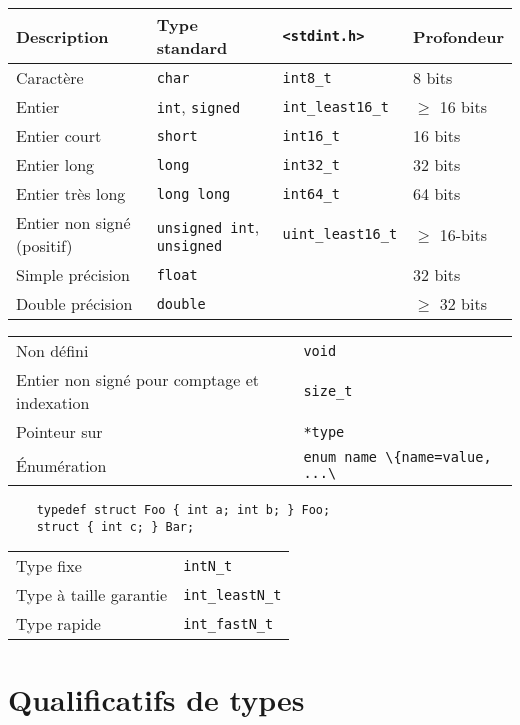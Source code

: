 \documentclass{article}
\newcommand{\cd}{\lstinline}
\begin{document}
\begin{multicols*}{3}
\begin{tabularx}{\linewidth}{Xlll}
  \bf Description & \bf Type standard & \bf \texttt{<stdint.h>} & \bf Profondeur \\
  \hline
  Caractère                   & \cd{char}      & \cd {int8_t} & 8 bits \\
  \hline
  Entier                      & \cd{int}, \cd{signed}  & \cd {int_least16_t} & $\geq$ 16 bits \\
  Entier court                & \cd{short}     & \cd {int16_t} & 16 bits \\
  Entier long                 & \cd{long}      & \cd {int32_t} & 32 bits \\
  Entier très long            & \cd{long long} & \cd {int64_t} & 64 bits \\
  Entier non signé (positif)  & \cd{unsigned int}, \cd{unsigned} & \cd{uint_least16_t} & $\geq$ 16-bits \\
  \hline
  Simple précision            & \cd{float}     &  & 32 bits \\
  Double précision            & \cd{double}    &  & $\geq$ 32 bits \\
\end{tabularx}



  \begin{tabularx}{\linewidth}{Xl}
    Non défini                 & \cd{void} \\
    Entier non signé pour comptage et indexation & \cd{size_t} \\
    Pointeur sur                       & \cd{*type} \\
    Énumération                        & \cd{enum name \{name=value, ...\}};
  \end{tabularx}

  \begin{lstlisting}
    typedef struct Foo { int a; int b; } Foo;
    struct { int c; } Bar;
  \end{lstlisting}

  \begin{tabularx}{\linewidth}{Xl}
  Type fixe & \cd{intN_t} \\
  Type à taille garantie & \cd{int_leastN_t} \\
  Type rapide & \cd{int_fastN_t}
  \end{tabularx}

\section*{Qualificatifs de types}


\end{multicols*}
\end{document}
